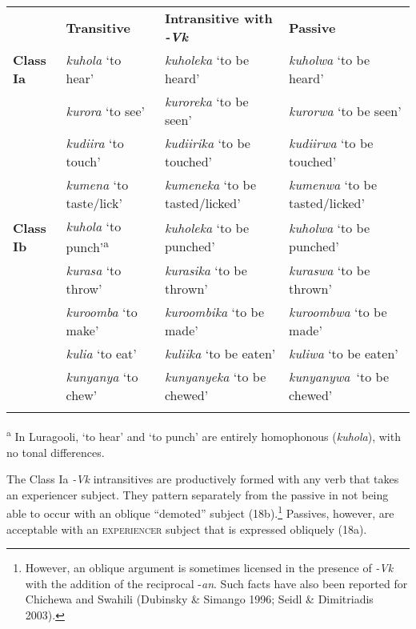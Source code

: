 \documentclass[output=paper]{langsci/langscibook}
\begin{document}
\begin{styleTabellenberschrift}
\begin{styleTabellenberschrift}
\begin{tabularx}{\textwidth}{XXXX} & \textbf{Transitive} & \textbf{Intransitive with }\textbf{\textit{{}-Vk}} & \textbf{Passive}\\
\lsptoprule
\textbf{Class Ia} & \textit{kuhola} ‘to hear’ & \textit{kuholeka }‘to be heard’ & \textit{kuholwa} ‘to be heard’\\
& \textit{kurora} ‘to see’ & \textit{kuroreka} ‘to be seen’ & \textit{kurorwa} ‘to be seen’\\
\hhline{~---} & \textit{kudiira} ‘to touch’ & \textit{kudiirika} ‘to be touched’ & \textit{kudiirwa} ‘to be touched’\\
\hhline{~---} & \textit{kumena} ‘to taste/lick’ & \textit{kumeneka} ‘to be tasted/licked’ & \textit{kumenwa} ‘to be tasted/licked’\\
\textbf{Class Ib} & \textit{kuhola} ‘to punch’\textsuperscript{a} & \textit{kuholeka} ‘to be punched’ & \textit{kuholwa} ‘to be punched’\\
& \textit{kurasa} ‘to throw’ & \textit{kurasika} ‘to be thrown’ & \textit{kuraswa} ‘to be thrown’\\
\hhline{~---} & \textit{kuroomba} ‘to make’ & \textit{kuroombika} ‘to be made’ & \textit{kuroombwa} ‘to be made’\\
\hhline{~---} & \textit{kulia} ‘to eat’ & \textit{kuliika} ‘to be eaten’ & \textit{kuliwa} ‘to be eaten’\\
\hhline{~---} & \textit{kunyanya} ‘to chew’ & \textit{kunyanyeka} ‘to be chewed’ & \textit{kunyanywa}~‘to be chewed’\\
\hhline{~---}
\lspbottomrule
\end{tabularx}
\textsuperscript{a }In Luragooli, ‘to hear’ and ‘to punch’\textit{ }are entirely homophonous (\textit{kuhola}), with no tonal differences.

The Class Ia \textit{{}-Vk }intransitives are productively formed with any verb that takes an experiencer subject. They pattern separately from the passive in not being able to occur with an oblique “demoted” subject (18b).\footnote{ However, an oblique argument is sometimes licensed in the presence of \textit{{}-Vk} with the addition of the reciprocal -\textit{an}. Such facts have also been reported for Chichewa and Swahili (Dubinsky \& Simango 1996; Seidl \& Dimitriadis 2003).}\textsuperscript{ } Passives, however, are acceptable with an \textsc{experiencer} subject that is expressed obliquely (18a).%
%


\end{styleTabellenberschrift}
\end{styleTabellenberschrift}
\end{document}

